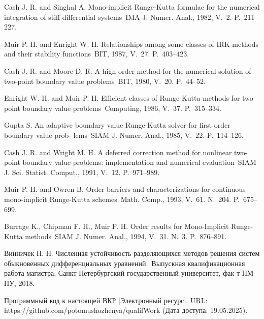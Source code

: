 \documentclass[a4paper,article,14pt]{extarticle}
\begin{document}
\begin{thebibliography}{1}
 Cash J. R. and Singhal A. \flqq Mono-implicit Runge-Kutta formulae for the numerical integration of stiff differential systems\frqq~IMA J. Numer. Anal., 1982, V.~2. P.~211--227.

 Muir P. H. and Enright W. H. \flqq Relationships among some classes of IRK methods and their stability functions\frqq~BIT, 1987, V.~27. P.~403--423.

 Cash J. R. and Moore D. R. \flqq A high order method for the numerical solution of two-point boundary value problems\frqq~BIT, 1980, V.~20. P.~44--52.

 Enright W. H. and Muir P. H. \flqq Efficient classes of Runge-Kutta methods for two-point boundary value problems\frqq~Computing, 1986, V.~37. P.~315--334.

 Gupta S. \flqq An adaptive boundary value Runge-Kutta solver for first order boundary value prob-
lems\frqq~SIAM J. Numer. Anal., 1985, V.~22. P.~114--126.

 Cash J. R. and Wright M. H. \flqq A deferred correction method for nonlinear two-point boundary
value problems: implementation and numerical evaluation\frqq~SIAM J. Sci. Statist. Comput., 1991, V.~12. P.~971--989.

 Muir P. H. and Owren B. \flqq Order barriers and characterizations for continuous mono-implicit
Runge-Kutta schemes\frqq~Math. Comp., 1993, V.~61. N.~204. P.~675--699.

 Burrage K., Chipman F. H., Muir P. H. \flqq Order results for Mono-Implicit Runge-Kutta methods\frqq~SIAM J. Numer. Anal., 1994, V.~31. N.~3. P.~876--891.

 Винничек Н. Н. \flqq Численная устойчивость разделяющихся методов решения систем обыкновенных дифференциальных уравнений.\frqq~Выпускная квалификационная работа магистра, Санкт-Петербургский государственный университет, фак-т ПМ-ПУ, 2018.

 Программный код к настоящей ВКР [Электронный ресурс]. URL: https://github.com/potomushozhenya/qualifWork (Дата доступа: 19.05.2025).

\end{thebibliography}
\pagebreak

\end{document}
